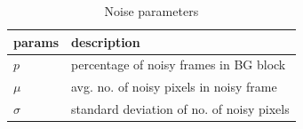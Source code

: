 \begin{table}
\centering
\caption{Noise parameters}  \vspace{5pt}
\label{table:noise-params}
\begin{tabular}{|l|l|}
\hline
params & description                              \\ \hline \hline
$p$          & percentage of noisy frames in BG block  \\ 
$\mu$        & avg. no. of noisy pixels in noisy frame     \\ 
$\sigma$     & standard deviation of no. of noisy pixels     \\ \hline
\end{tabular}
\end{table}
